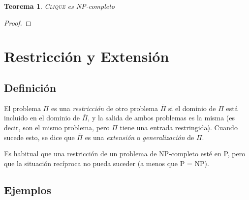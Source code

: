 \documentclass[a4paper]{report}
\newtheorem*{theorem*}{Teorema}
\begin{document}
\begin{theorem*}
    \textsc{Clique} es NP-completo
\end{theorem*}
\begin{proof}
\end{proof}


\section{Restricción y Extensión}

\subsection{Definición}

El problema $\Pi$ es una \textit{restricción} de otro problema $\bar{\Pi}$ si el dominio de $\Pi$ está incluido en el dominio de $\bar{\Pi}$, y la salida de ambos problemas es la misma (es decir, son el mismo problema, pero $\Pi$ tiene una entrada restringida). Cuando sucede esto, se dice que $\bar{\Pi}$ es una \textit{extensión} o \textit{generalización} de $\Pi$.

Es habitual que una restricción de un problema de NP-completo esté en P, pero que la situación recíproca no pueda suceder (a menos que P = NP).

\subsection{Ejemplos}
\end{document}
